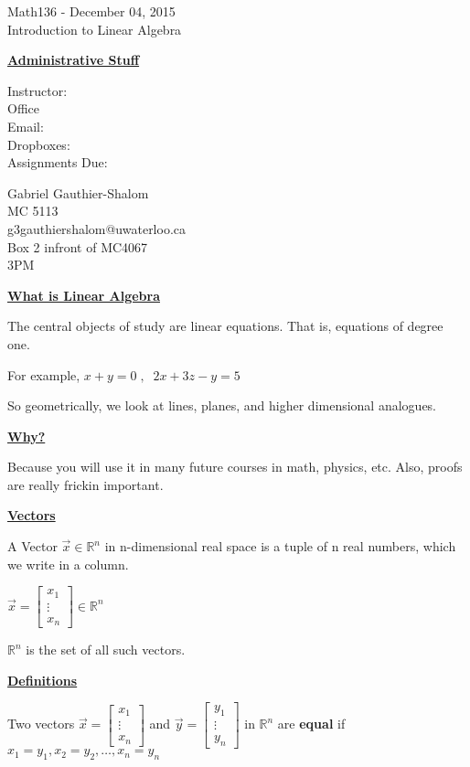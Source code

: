 \documentclass{letter}
\begin{document}
	\begin{center}
		\LARGE Math136 - December 04, 2015\\
		\large Introduction to Linear Algebra
	\end{center}
	\vspace{0.25 in}
	\underline{\textbf{Administrative Stuff}}
	
		\begin{minipage}[t]{0.2\textwidth}
			Instructor: \\
			Office\\
			Email:\\
			Dropboxes:\\
			Assignments Due:
		\end{minipage}
		\begin{minipage}[t]{0.8\textwidth}
			Gabriel Gauthier-Shalom\\
			MC 5113\\
			g3gauthiershalom@uwaterloo.ca\\
			Box 2 infront of MC4067\\
			3PM
		\end{minipage}
		
	\underline{\textbf{What is Linear Algebra}}
	
	The central objects of study are linear equations. That is, equations of degree one.

	For example, $x+y=0\;,\;\; 2x+3z-y = 5$
	
	So geometrically, we look at lines, planes, and higher dimensional analogues.
	
	\underline{\textbf{Why?}}
	
	Because you will use it in many future courses in math, physics, etc. Also, proofs are really frickin important.
	
	\underline{\textbf{Vectors}}
	
	A Vector $\vec x \in \mathbb{R}^n$ in n-dimensional real space is a tuple of n real numbers, which we write in a column.
	
	$\vec x = \begin{bmatrix}
		x_1\\
		\vdots\\
		x_n
	\end{bmatrix} \in \mathbb{R}^n$
	
	$\mathbb{R}^n$ is the set of all such vectors.
	
	\underline{\textbf{Definitions}}
	
	Two vectors $\vec x = \begin{bmatrix}x_1\\\vdots\\x_n\end{bmatrix}$ and $\vec y = \begin{bmatrix}y_1\\\vdots\\y_n\end{bmatrix}$ in $\mathbb{R}^n$ are \textbf{equal} if $x_1 = y_1, x_2 = y_2, \dots, x_n = y_n$
	
\end{document}
